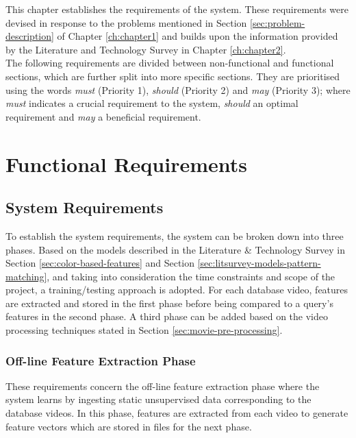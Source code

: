This chapter establishes the requirements of the system. These requirements were devised in response to the problems mentioned in Section \ref{sec:problem-description} of Chapter \ref{ch:chapter1} and builds upon the information provided by the Literature and Technology Survey in Chapter \ref{ch:chapter2}.\\

The following requirements are divided between non-functional and functional sections, which are further split into more specific sections. They are prioritised using the words \textit{must} (Priority 1), \textit{should} (Priority 2) and \textit{may} (Priority 3); where \textit{must} indicates a crucial requirement to the system, \textit{should} an optimal requirement and \textit{may} a beneficial requirement.

\section{Functional Requirements}

\subsection{System Requirements}

To establish the system requirements, the system can be broken down into three phases. Based on the models described in the Literature \& Technology Survey in Section \ref{sec:color-based-features} and Section \ref{sec:litsurvey-models-pattern-matching}, and taking into consideration the time constraints and scope of the project, a training/testing approach is adopted. For each database video, features are extracted and stored in the first phase before being compared to a query's features in the second phase. A third phase can be added based on the video processing techniques stated in Section \ref{sec:movie-pre-processing}.

\subsubsection{Off-line Feature Extraction Phase}

These requirements concern the off-line feature extraction phase where the system learns by ingesting static unsupervised data corresponding to the database videos. In this phase, features are extracted from each video to generate feature vectors which are stored in files for the next phase.

